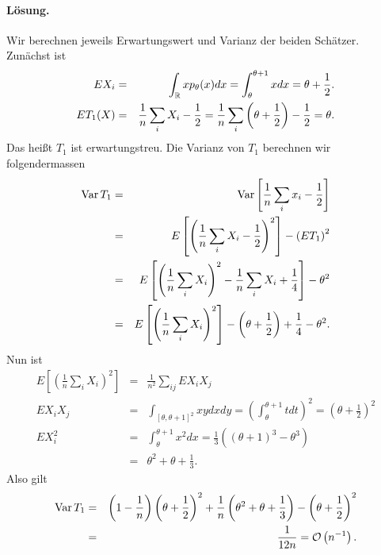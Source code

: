 \paragraph*{Lösung.} Wir berechnen jeweils Erwartungswert und Varianz der beiden Schätzer. 
Zunächst ist 
\begin{eqnarray}
	E X_i &=&  \int_{\mathbb R}^{} x p_\theta(x) dx = \int_{\theta}^{\theta+1} x dx = \theta + \frac{1}{2}. \\
	E T_1(X) &=&  \frac{1}{n} \sum_{i}^{} X_i - \frac{1}{2} = \frac{1}{n} \sum_{i}^{} \left( \theta + \frac{1}{2} \right) -\frac{1}{2} = \theta.
\end{eqnarray}
Das heißt $T_1$ ist erwartungstreu. Die Varianz von $T_1$ berechnen wir folgendermassen
\begin{eqnarray}
	\operatorname{Var} T_1 &=& \operatorname{Var} \left[ \frac{1}{n} \sum_{i}^{} x_i - \frac{1}{2} \right] \\
	&=& E\left[ \left(  \frac{1}{n} \sum_{i}^{} X_i - \frac{1}{2} \right)^2  \right] - \left( E T_1 \right)^2 \\
	&=& E \left[  \left( \frac{1}{n} \sum_{i}^{} X_i \right)^2  - \frac{1}{n}\sum_{i}^{} X_i +\frac{1}{4} \right]-\theta^2 \\
	&=& E \left[ \left( \frac{1}{n} \sum_{i}^{} X_i \right)^2 \right] - \left( \theta + \frac{1}{2} \right) + \frac{1}{4}-\theta^2.
\end{eqnarray}
Nun ist 
\begin{eqnarray}
	E \left[ \left( \frac{1}{n} \sum_{i}^{} X_i \right)^2 \right] &=& \frac{1}{n^2} \sum_{ij}^{} E X_i X_j \\
	E X_i X_j &=& \int_{[\theta,\theta+1]^2}^{} xy dx dy = \left( \int_{\theta}^{\theta+1} t dt \right)^2 = \left( \theta+\frac{1}{2} \right)^2 \\
	E X_i^2 &=& \int_{\theta}^{\theta+1} x^2 dx = \frac{1}{3}\left( \left( \theta+1 \right)^3 - \theta^3 \right )\\
	&=& \theta^2 + \theta + \frac{1}{3}.
\end{eqnarray}
Also gilt
\begin{eqnarray}
	\operatorname{Var} T_1 &=& \left( 1-\frac{1}{n} \right)\left( \theta+\frac{1}{2} \right)^2+\frac{1}{n}\left( \theta^2+\theta+\frac{1}{3} \right)     - \left( \theta+\frac{1}{2} \right)^2 \\
	&=& \frac{1}{12 n} = \mathcal O \left( n^{-1} \right).
\end{eqnarray}

